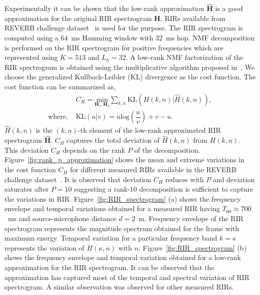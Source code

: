 Experimentally it can be shown that the low-rank approximation $\mathbf{\hat{H}}$ is a good approximation for the original RIR spectrogram $\mathbf{H}$. RIRs available from REVERB challenge dataset~\cite{kinoshita2016summary} is used for the purpose. The RIR spectrogram is computed using a $64$~ms Hamming window with $32$~ms hop. NMF decomposition is performed on the RIR spectrogram for positive frequencies which are represented using $K=513$ and $L_h=32$.
A low-rank NMF factorization of the RIR spectrogram is obtained using the multiplicative algorithm proposed in~\cite{lee99}. We choose the generalized Kullback-Leibler (KL) divergence as the cost function. The cost function can be summarized as,
\begin{align}
&C_H = \underset{\mathbf{H}_1, \mathbf{H}_2}{\text{min}} \sum_{k,n}\text{KL} (H(k,n)|\hat{H}(k,n)), \nonumber \\
\text{where, } &\text{KL}(u|v) = u\text{log}(\dfrac{u}{v}) + v - u.
\label{eq:KLdiv}
\end{align} 
$\hat{H}(k,n)$ is the $(k,n)$-th element of the low-rank approximated RIR spectrogram $\mathbf{\hat{H}}$. $C_H$ captures the total deviation of $\hat{H}(k,n)$ from $H(k,n)$. This deviation $C_H$ depends on the rank $P$ of the decomposition. Figure~\ref{fig:rank_p_approximation} shows the mean and extreme variations in the cost function $C_H$ for different measured RIRs available in the REVERB challenge dataset~\cite{kinoshita2016summary}. It is observed that deviation $C_H$ reduces with $P$ and deviation saturates after $P = 10$ suggesting a rank-$10$ decomposition is sufficient to capture the variations in RIR. Figure~\ref{fig:RIR_spectrogram} (a) shows the frequency envelope and temporal variations obtained for a measured RIR having $T_{60}\approx 700$~ms and source-microphone distance $d=2$~m. Frequency envelope of the RIR spectrogram represents the magnitude spectrum obtained for the frame with maximum energy. Temporal variation for a particular frequency band $k=\kappa$ represents the variation of $H(\kappa,n)$ with $n$.
Figure~\ref{fig:RIR_spectrogram} (b) shows the frequency envelope and temporal variation obtained for a low-rank approximation for the RIR spectrogram. It can be observed that the approximation has captured most of the temporal and spectral variation of RIR spectrogram. A similar observation was observed for other measured RIRs.

